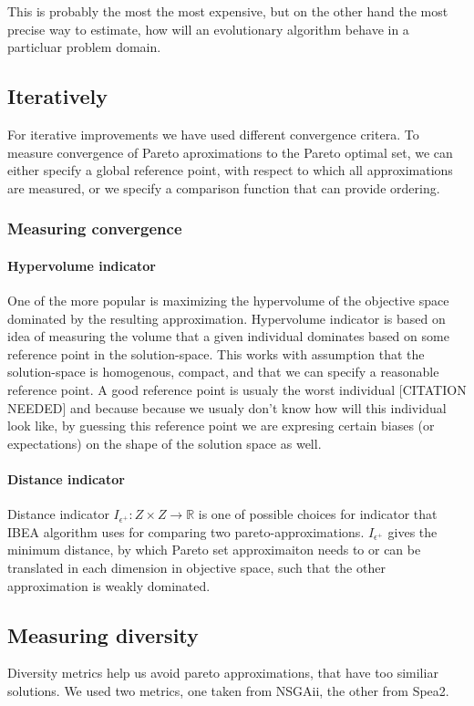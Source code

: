 \documentclass[12pt,oneside,draft]{fithesis2}
\begin{document}
This is probably the most the most expensive, but on the other hand the most precise way to estimate, how will an evolutionary algorithm behave in a particluar problem domain.


\subsection{Iteratively}

For iterative improvements we have used different convergence critera. To measure convergence of Pareto aproximations to the Pareto optimal set, we can either specify a global reference point, with respect to which all approximations are measured, or we specify a comparison function that can provide ordering.

\subsubsection{Measuring convergence}

\paragraph{Hypervolume indicator}
One of the more popular is maximizing the hypervolume of the objective space dominated by the resulting approximation. Hypervolume indicator is based on idea of measuring the volume that a given individual dominates based on some reference point in the solution-space. This works with assumption that the solution-space is homogenous, compact, and that we can specify a reasonable reference point. A good reference point is usualy the worst individual [CITATION NEEDED] and because because we usualy don't know how will this individual look like, by guessing this reference point we are expresing certain biases (or expectations) on the shape of the solution space as well.

\paragraph{Distance indicator}
Distance indicator $I_{\epsilon^{+}}: Z \times Z \to  \mathbb{R}$ is one of possible choices for indicator that IBEA algorithm uses for comparing two pareto-approximations. $I_{\epsilon^{+}}$ gives the minimum distance, by which Pareto set approximaiton needs to or can be translated in each dimension in objective space, such that the other approximation is weakly dominated.

\subsection{Measuring diversity}
Diversity metrics help us avoid pareto approximations, that have too similiar solutions. We used two metrics, one taken from NSGAii, the other from Spea2.
\end{document}

